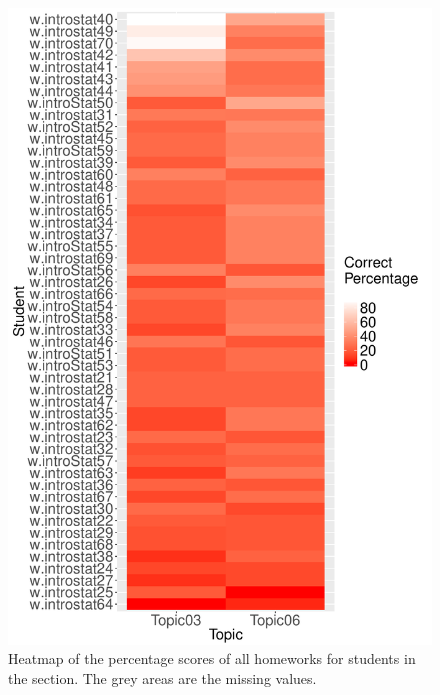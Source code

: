 \documentclass[12pt,nohyper]{tufte-handout}\usepackage[]{graphicx}\usepackage[]{color}
\begin{document}
\begin{center}
\begin{figure}
\begin{centering}
\includegraphics[width=0.99\linewidth]{Stat101_SectionAB_tile_student_topic}
\par\end{centering}
\caption{\label{fig:heatmap}Heatmap of the percentage scores of all homeworks for students in the section. The grey areas are the missing values.}
\end{figure}\par\end{center}

\clearpage
\end{document}

